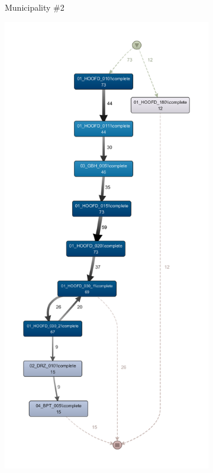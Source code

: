\begin{figure}
\begin{subfigure}[t]{.2\textwidth}
    \caption{Municipality \#2}
    \label{fig:coselog-wabo-process-models-simplified-2}
  \end{subfigure} 
  \begin{subfigure}[t]{.3\textwidth}
    \centering
        \includegraphics[width=1\linewidth]{5_results_discussions/coselog-wabo/coselog-wabo-3-simplified}

\end{subfigure}
\end{figure}
